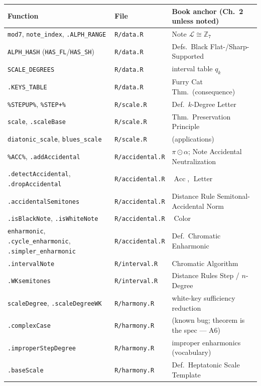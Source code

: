 \documentclass[11pt]{article}
\newcommand{\MAlph}{\mathcal{L}}                 %
\newcommand{\Zseven}{\mathbb{Z}_7}
\newcommand{\Colorf}{\operatorname{Color}}
\newcommand{\Accf}{\operatorname{Acc}}
\newcommand{\Letterf}{\operatorname{Letter}}
\newcommand{\pit}{\pi}                          %
\theoremstyle{definition}
\theoremstyle{remark}
\newcommand{\code}[1]{\texttt{#1}}
\newcommand{\file}[1]{\texttt{#1}}
\begin{document}
\begin{center}
\renewcommand{\arraystretch}{1.35}
\small
\begin{tabular}{@{}llp{5.6cm}@{}}
\toprule
\textbf{Function} & \textbf{File} & \textbf{Book anchor (Ch.~2 unless noted)} \\
\midrule
\code{mod7}, \code{note\_index}, \code{.ALPH\_RANGE} & \file{R/data.R} & Note $\MAlph \cong \Zseven$ \\
\code{ALPH\_HASH} (\code{HAS\_FL}/\code{HAS\_SH}) & \file{R/data.R} & Defs.\ Black Flat-/Sharp-Supported \\
\code{SCALE\_DEGREES} & \file{R/data.R} & interval table $q_k$ \\
\code{.KEYS\_TABLE} & \file{R/data.R} & Furry Cat Thm.\ (consequence) \\
\code{\%STEPUP\%}, \code{\%STEP+\%} & \file{R/scale.R} & Def.\ $k$-Degree Letter \\
\code{scale}, \code{.scaleBase} & \file{R/scale.R} & Thm.\ Preservation Principle \\
\code{diatonic\_scale}, \code{blues\_scale} & \file{R/scale.R} & (applications) \\
\code{\%ACC\%}, \code{.addAccidental} & \file{R/accidental.R} & $\pit \odot \alpha$; Note Accidental Neutralization \\
\code{.detectAccidental}, \code{.dropAccidental} & \file{R/accidental.R} & $\Accf$, $\Letterf$ \\
\code{.accidentalSemitones} & \file{R/accidental.R} & Distance Rule Semitonal-Accidental Norm \\
\code{.isBlackNote}, \code{.isWhiteNote} & \file{R/accidental.R} & $\Colorf$ \\
\code{enharmonic}, \code{.cycle\_enharmonic}, \code{.simpler\_enharmonic} & \file{R/accidental.R} & Def.\ Chromatic Enharmonic \\
\code{.intervalNote} & \file{R/interval.R} & Chromatic Algorithm \\
\code{.WKsemitones} & \file{R/interval.R} & Distance Rules Step / $n$-Degree \\
\code{scaleDegree}, \code{.scaleDegreeWK} & \file{R/harmony.R} & white-key sufficiency reduction \\
\code{.complexCase} & \file{R/harmony.R} & (known bug; theorem is the spec --- A6) \\
\code{.improperStepDegree} & \file{R/harmony.R} & improper enharmonics (vocabulary) \\
\code{.baseScale} & \file{R/harmony.R} & Def.\ Heptatonic Scale Template \\

\end{tabular}
\end{center}
\end{document}
